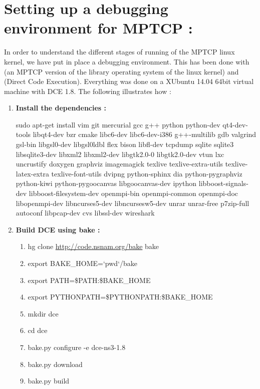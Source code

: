 \documentclass[a4paper,11pt]{article}
\begin{document}
	\clearpage
	\section{Setting up a debugging environment for MPTCP : }

		\label{sec:mptcpdebug}

		In order to understand the different stages of running of the MPTCP linux kernel, we have put in place a debugging environment. This has been done with \cite[LibOS]{libos} (an MPTCP version of the library operating system of the linux kernel) and \cite[DCE]{dce} (Direct Code Execution). Everything was done on a XUbuntu 14.04 64bit virtual machine with DCE 1.8. The following illustrates how :

		\begin{enumerate}
			\sloppy
			\item \textbf{Install the dependencies :}
				
			\nohyphens{
				sudo apt-get install vim git mercurial gcc g++ python python-dev qt4-dev-tools libqt4-dev bzr cmake libc6-dev libc6-dev-i386 g++-multilib gdb valgrind gsl-bin libgsl0-dev libgsl0ldbl flex bison libfl-dev tcpdump sqlite sqlite3 libsqlite3-dev libxml2 libxml2-dev libgtk2.0-0 libgtk2.0-dev vtun lxc uncrustify doxygen graphviz imagemagick texlive texlive-extra-utils texlive-latex-extra texlive-font-utils dvipng python-sphinx dia python-pygraphviz python-kiwi python-pygoocanvas libgoocanvas-dev ipython libboost-signals-dev libboost-filesystem-dev openmpi-bin openmpi-common openmpi-doc libopenmpi-dev libncurses5-dev libncursesw5-dev unrar unrar-free p7zip-full autoconf libpcap-dev cvs libssl-dev wireshark}

			\item \textbf{Build DCE using bake :}

				\begin{enumerate}

					\item hg clone \url{http://code.nsnam.org/bake} bake
					\item export BAKE\_HOME=`pwd`/bake
					\item export PATH=\$PATH:\$BAKE\_HOME
					\item export PYTHONPATH=\$PYTHONPATH:\$BAKE\_HOME
					\item mkdir dce
					\item cd dce
					\item bake.py configure -e dce-ns3-1.8
					\item bake.py download
					\item bake.py build


\end{enumerate}
\end{enumerate}
\end{document}
